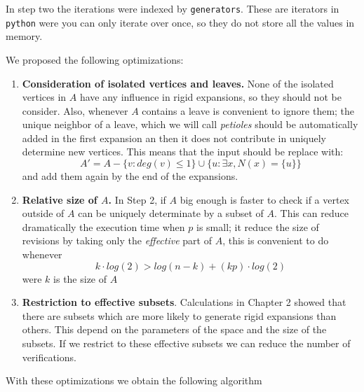 In step two the iterations were indexed by \texttt{generators}. These are iterators in \texttt{python} were you can only iterate over once, so they do not store all the values in memory.

We proposed the following optimizations:

\begin{enumerate}
\item \textbf{Consideration of isolated vertices and leaves.} None of the isolated vertices in $A$ have any influence in rigid expansions, so they should not be consider. Also, whenever $A$ contains a leave is convenient to ignore them; the unique neighbor of a leave, which we will call \textit{petioles} should be automatically added in the first expansion an then it does not contribute in uniquely determine new vertices. This means that the input should be replace with:
$$A' = A - \{v: deg(v)\leq 1 \} \cup \{u: \exists x, N(x)=\{u\}\} $$
and add them again by the end of the expansions.
\item \textbf{Relative size of $A$.} In Step 2, if $A$ big enough is faster to check if a vertex outside of $A$ can be uniquely determinate by a subset of $A$. This can reduce dramatically the execution time when $p$ is small; it reduce the size of revisions by taking only the \textit{effective} part of $A$, this is convenient to do whenever
$$k\cdot log(2) > log(n-k) + (kp)\cdot log(2)$$
were $k$ is the size of $A$

\item \textbf{Restriction to effective subsets}. Calculations in Chapter 2 showed that there are subsets which are more likely to generate rigid expansions than others. This depend on the parameters of the space and the size of the subsets. If we restrict to these effective subsets we can reduce the number of verifications.
\end{enumerate}

With these optimizations we obtain the following algorithm

